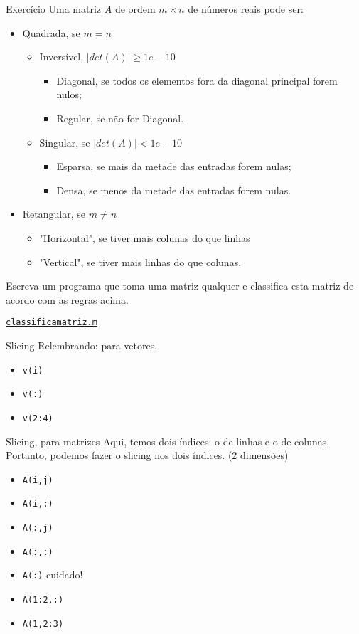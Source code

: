 \documentclass[hyperref={pdfpagelabels=false}]{beamer}
\begin{document}
\begin{frame}{Exercício}
	Uma matriz $A$ de ordem $m\times n$ de números reais pode ser:
	\begin{itemize}
	\item Quadrada, se $m=n$
	  \begin{itemize}
		\item Inversível, $|det(A)|\geq 1e-10$
			\begin{itemize}
			\item Diagonal, se todos os elementos fora da diagonal principal
        forem nulos;
			\item Regular, se não for Diagonal.
			\end{itemize}
		\item Singular, se $|det(A)| < 1e-10$
			\begin{itemize}
			\item Esparsa, se mais da metade das entradas forem nulas;
			\item Densa, se menos da metade das entradas forem nulas.
			\end{itemize}
	  \end{itemize}
	\item Retangular, se $m\ne n$
		\begin{itemize}
		\item "Horizontal", se tiver mais colunas do que linhas
		\item "Vertical", se tiver mais linhas do que colunas.
		\end{itemize}
	\end{itemize}
  Escreva um programa que toma uma matriz qualquer e classifica esta matriz de acordo com as regras acima.
  \vfill
  \begin{center} \href{listings/classificarmatriz.m}{\underline{\texttt{classificamatriz.m}}} \end{center}
\end{frame}

\begin{frame}{Slicing}
  Relembrando: para vetores, 
  \begin{itemize}
	\item {\texttt{v(i)}}
  \item {\texttt{v(:)}}
  \item {\texttt{v(2:4)}}
  \end{itemize}
\end{frame}

\begin{frame}{Slicing, para matrizes}
	Aqui, temos dois índices: o de linhas e o de colunas. Portanto, podemos fazer o slicing nos dois índices. (2 dimensões)
	\begin{itemize}
	\item {\texttt{A(i,j)}}
	\item {\texttt{A(i,:)}}
	\item {\texttt{A(:,j)}}
	\item {\texttt{A(:,:)}}
	\item {\texttt{A(:)}} \alert{cuidado!}
	\item {\texttt{A(1:2,:)}}
	\item {\texttt{A(1,2:3)}}
	\end{itemize}
\end{frame}
\end{document}
